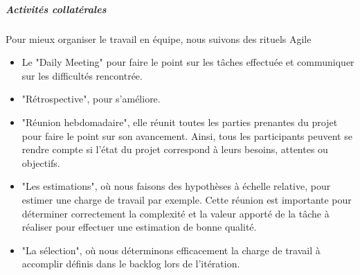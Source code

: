 \subparagraph{Activités collatérales} Pour mieux organiser le travail en équipe, nous suivons des rituels Agile
\begin{itemize}
  \item Le "Daily Meeting" pour faire le point sur les tâches effectuée et communiquer sur les difficultés rencontrée.
  \item "Rétrospective", pour s’améliore.
  \item "Réunion hebdomadaire",  elle réunit toutes les parties prenantes du projet pour faire le point sur son avancement. Ainsi, tous les participants peuvent se rendre compte si l’état du projet correspond à leurs besoins, attentes ou objectifs.
  \item "Les estimations", où nous faisons des hypothèses à échelle relative, pour estimer une charge de travail par exemple. Cette réunion est importante pour déterminer correctement la complexité et la valeur apporté de la tâche à réaliser pour effectuer une estimation de bonne qualité.
  \item "La sélection", où nous déterminons efficacement la charge de travail à accomplir définis dans le backlog lors de l'itération.
\end{itemize}
